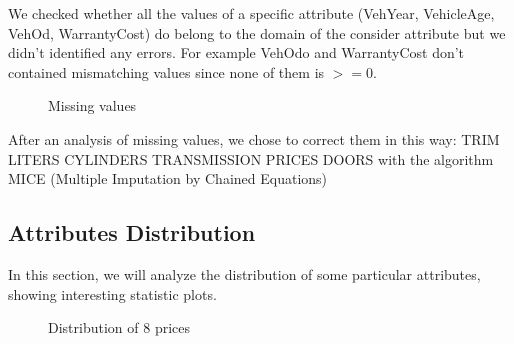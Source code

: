 \documentclass{article}
\begin{document}
We checked whether all the values of a specific attribute (VehYear, VehicleAge, VehOd, WarrantyCost) do belong to the domain of the consider attribute but we didn’t identified any errors.  For example VehOdo and WarrantyCost don’t contained mismatching values since 
none of them is $>=0$.

\begin{figure}[H]
	\centering
	\caption{{ Missing values }}
\end{figure}

After an analysis of missing values, we chose to correct them in this way: TRIM
LITERS
CYLINDERS
TRANSMISSION
PRICES
DOORS 
with the algorithm MICE (Multiple Imputation by Chained Equations) 




\subsection{Attributes Distribution}
In this section, we will analyze the distribution of some particular attributes, showing interesting statistic plots.
 

\begin{figure}[H]
	\centering
	\caption{{ Distribution of 8 prices}}
\end{figure}
\end{document}

